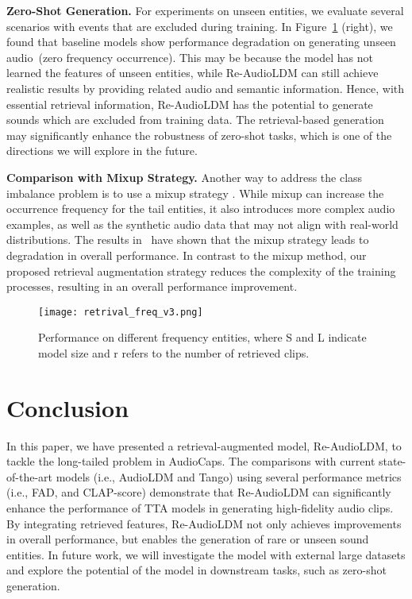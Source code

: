 \documentclass{article}
\begin{document}
\noindent
\textbf{Zero-Shot Generation.}
For experiments on unseen entities, we evaluate several scenarios with events that are excluded during training. In Figure~\ref{fig:retrival-freq} (right), we found that baseline models show performance degradation on generating unseen audio~(zero frequency occurrence). This may be because the model has not learned the features of unseen entities, while Re-AudioLDM can still achieve realistic results by providing related audio and semantic information. Hence, with essential retrieval information, Re-AudioLDM has the potential to generate sounds which are excluded from training data. The retrieval-based generation may significantly enhance the robustness of zero-shot tasks, which is one of the directions we will explore in the future. 

\noindent
\textbf{Comparison with Mixup Strategy.}
Another way to address the class imbalance problem is to use a mixup strategy \cite{kong2020panns}. While mixup can increase the occurrence frequency for the tail entities, it also introduces more complex audio examples, as well as the synthetic audio data that may not align with real-world distributions. The results in~\cite{audioldm} have shown that the mixup strategy leads to degradation in overall performance. In contrast to the mixup method, our proposed retrieval augmentation strategy reduces the complexity of the training processes, resulting in an overall performance improvement.

\begin{figure}[htbp]
    \centering
    \texttt{[image: retrival\_freq\_v3.png]}
    \caption{Performance on different frequency entities, where S and L indicate model size and r refers to the number of retrieved clips. }
    \label{fig:retrival-freq}


\end{figure}


\section{Conclusion}
\label{sec:conclusion}
In this paper, we have presented a retrieval-augmented model, Re-AudioLDM, to tackle the long-tailed problem in AudioCaps. The comparisons with current state-of-the-art models (i.e., AudioLDM and Tango) using several performance metrics (i.e., FAD, and CLAP-score) demonstrate that Re-AudioLDM can significantly enhance the performance of TTA models in generating high-fidelity audio clips. By integrating retrieved features, Re-AudioLDM not only achieves improvements in overall performance, but enables the generation of rare or unseen sound entities. In future work, we will investigate the model with external large datasets and explore the potential of the model in downstream tasks, such as zero-shot generation.  
\end{document}

